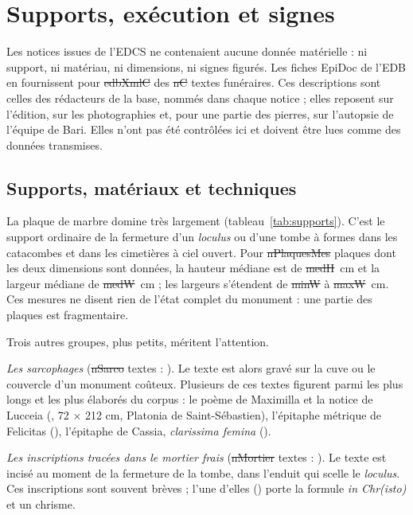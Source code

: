 \chapter{Supports, exécution et signes}\label{ch:supports}

Les notices issues de l’EDCS ne contenaient aucune donnée matérielle : ni support, ni matériau, ni dimensions, ni signes figurés. Les fiches EpiDoc de l’EDB en fournissent pour \st{edbXmlC} des \st{nC} textes funéraires. Ces descriptions sont celles des rédacteurs de la base, nommés dans chaque notice ; elles reposent sur l’édition, sur les photographies et, pour une partie des pierres, sur l’autopsie de l’équipe de Bari. Elles n’ont pas été contrôlées ici et doivent être lues comme des données transmises.

\section{Supports, matériaux et techniques}



La plaque de marbre domine très largement (tableau~\ref{tab:supports}). C’est le support ordinaire de la fermeture d’un \emph{loculus} ou d’une tombe à formes dans les catacombes et dans les cimetières à ciel ouvert. Pour \st{nPlaquesMes} plaques dont les deux dimensions sont données, la hauteur médiane est de \st{medH}~cm et la largeur médiane de \st{medW}~cm ; les largeurs s’étendent de \st{minW} à \st{maxW}~cm. Ces mesures ne disent rien de l’état complet du monument : une partie des plaques est fragmentaire.

Trois autres groupes, plus petits, méritent l’attention.

\emph{Les sarcophages} (\st{nSarco} textes : ). Le texte est alors gravé sur la cuve ou le couvercle d’un monument coûteux. Plusieurs de ces textes figurent parmi les plus longs et les plus élaborés du corpus : le poème de Maximilla et la notice de Lucceia (, 72 × 212 cm, Platonia de Saint-Sébastien), l’épitaphe métrique de Felicitas (), l’épitaphe de Cassia, \emph{clarissima femina} ().

\emph{Les inscriptions tracées dans le mortier frais} (\st{nMortier} textes : ). Le texte est incisé au moment de la fermeture de la tombe, dans l’enduit qui scelle le \emph{loculus}. Ces inscriptions sont souvent brèves ; l’une d’elles () porte la formule \emph{in Chr(isto)} et un chrisme.

